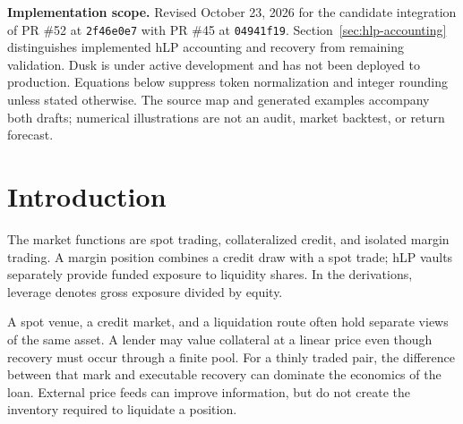 \begin{abstract}
Omnipair Dusk combines spot trading, collateralized credit, isolated margin positions, and funded liquidity vaults in one market on Solana. Its accounting identity separates cash, indexed cash-backed debt, and vault-owned reserve claims. Spot execution applies a second separation: unpaid cash-backed interest is excluded from curve principal, and hLP ownership is removed to obtain the ordinary liquidity tranche on which traders execute. A full-range constant-product tail and two nested liquidity bands define a continuous, piecewise analytic reserve path. After a trade, the program reconstructs hLP ownership and opposite-asset funding algebraically. Credit uses conservative internal price and depth observations, while realized yield, recenter funding, and loss recovery have distinct accounting paths. This paper describes the implemented mechanisms and their limitations, with reproducible numerical illustrations of the curve, interest controller, and hLP recovery incentives.
\end{abstract}

\textbf{Implementation scope.} Revised October 23, 2026 for the candidate integration of PR \#52 at \texttt{2f46e0e7} with PR \#45 at \texttt{04941f19}. Section~\ref{sec:hlp-accounting} distinguishes implemented hLP accounting and recovery from remaining validation. Dusk is under active development and has not been deployed to production. Equations below suppress token normalization and integer rounding unless stated otherwise. The source map and generated examples accompany both drafts; numerical illustrations are not an audit, market backtest, or return forecast.

\section{Introduction}

The market functions are spot trading, collateralized credit, and isolated margin trading. A margin position combines a credit draw with a spot trade; hLP vaults separately provide funded exposure to liquidity shares. In the derivations, leverage denotes gross exposure divided by equity.

A spot venue, a credit market, and a liquidation route often hold separate views of the same asset. A lender may value collateral at a linear price even though recovery must occur through a finite pool. For a thinly traded pair, the difference between that mark and executable recovery can dominate the economics of the loan. External price feeds can improve information, but do not create the inventory required to liquidate a position.

